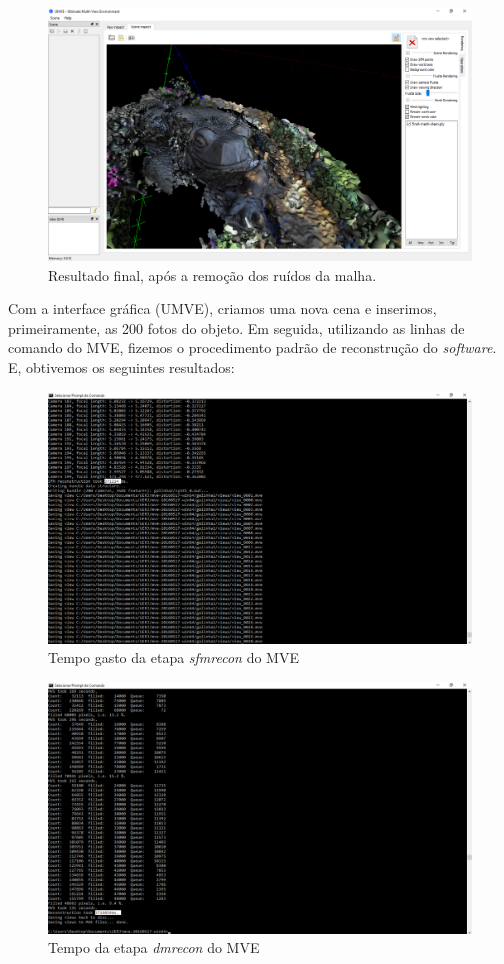 \begin{figure}[!h]
	\centering
	\includegraphics[width=1\linewidth]{figs/mvemeshclean.png}
	\caption{%
	Resultado final, após a remoção dos ruídos da malha.
	}\label{fig:MVEMeshClean}
\end{figure} 

Com a interface gráfica (UMVE), criamos uma nova cena e inserimos, primeiramente, as 200 fotos do objeto. Em seguida, utilizando as linhas de comando do MVE, fizemos o procedimento padrão de reconstrução do \emph{software}. E, obtivemos os seguintes resultados:

\begin{figure}[!h]
	\centering
	\includegraphics[width=0.5\linewidth]{figs/galinhalongesfmreconmve.png}
	\caption{%
	Tempo gasto da etapa \emph{sfmrecon} do MVE
	}\label{fig:sfmrecon1}
\end{figure}

\begin{figure}[!h]
	\centering
	\includegraphics[width=0.5\linewidth]{figs/galinhadmreconmve.png}
	\caption{%
	Tempo da etapa \emph{dmrecon} do MVE
	}\label{fig:dmrecon1}
\end{figure}

